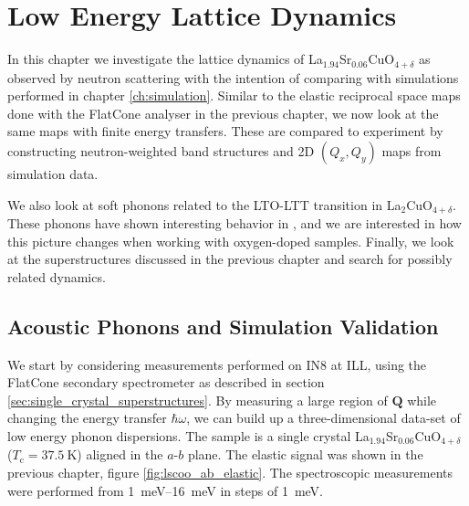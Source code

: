 \chapter{Low Energy Lattice Dynamics}\label{ch:lowen}
In this chapter we investigate the lattice dynamics of La$_{1.94}$Sr$_{0.06}$CuO$_{4+\delta}$ as observed by neutron scattering with the intention of comparing with simulations performed in chapter \ref{ch:simulation}. Similar to the elastic reciprocal space maps done with the FlatCone analyser in the previous chapter, we now look at the same maps with finite energy transfers. These are compared to experiment by constructing neutron-weighted band structures and 2D $(Q_x,Q_y)$ maps from simulation data.

We also look at soft phonons related to the LTO-LTT transition in La$_2$CuO$_{4+\delta}$. These phonons have shown interesting behavior in \LSCO{}, and we are interested in how this picture changes when working with oxygen-doped samples. Finally, we look at the superstructures discussed in the previous chapter and search for possibly related dynamics.

\section{Acoustic Phonons and Simulation Validation}
We start by considering measurements performed on IN8 at ILL, using the FlatCone secondary spectrometer as described in section \ref{sec:single_crystal_superstructures}. By measuring a large region of $\bm{Q}$ while changing the energy transfer $\hbar\omega$, we can build up a three-dimensional data-set of low energy phonon dispersions. The sample is a single crystal La$_{1.94}$Sr$_{0.06}$CuO$_{4+\delta}$ ($T_\text{c} = \SI{37.5}{\kelvin}$) aligned in the $a$-$b$ plane. The elastic signal was shown in the previous chapter, figure \ref{fig:lscoo_ab_elastic}. The spectroscopic measurements were performed from \SIrange{1}{16}{\milli\eV} in steps of \SI{1}{\milli\eV}.

